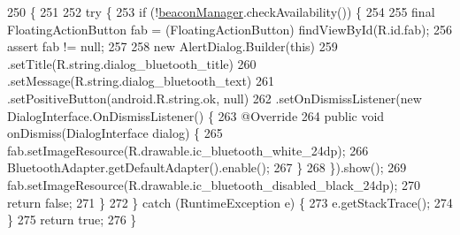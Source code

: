 \begin{DoxyCode}
250                                            \{
251 
252         \textcolor{keywordflow}{try} \{
253             \textcolor{keywordflow}{if} (!\hyperlink{classit_1_1unibo_1_1torsello_1_1bluetoothpositioning_1_1activities_1_1ApplicationActivity_a973c37226a3dbba6016966c3555aff65_a973c37226a3dbba6016966c3555aff65}{beaconManager}.checkAvailability()) \{
254 
255                 \textcolor{keyword}{final} FloatingActionButton fab = (FloatingActionButton) findViewById(R.id.fab);
256                 assert fab != null;
257 
258                 \textcolor{keyword}{new} AlertDialog.Builder(\textcolor{keyword}{this})
259                         .setTitle(R.string.dialog\_bluetooth\_title)
260                         .setMessage(R.string.dialog\_bluetooth\_text)
261                         .setPositiveButton(android.R.string.ok, null)
262                         .setOnDismissListener(\textcolor{keyword}{new} DialogInterface.OnDismissListener() \{
263                             @Override
264                             \textcolor{keyword}{public} \textcolor{keywordtype}{void} onDismiss(DialogInterface dialog) \{
265                                 fab.setImageResource(R.drawable.ic\_bluetooth\_white\_24dp);
266                                 BluetoothAdapter.getDefaultAdapter().enable();
267                             \}
268                         \}).show();
269                 fab.setImageResource(R.drawable.ic\_bluetooth\_disabled\_black\_24dp);
270                 \textcolor{keywordflow}{return} \textcolor{keyword}{false};
271             \}
272         \} \textcolor{keywordflow}{catch} (RuntimeException e) \{
273             e.getStackTrace();
274         \}
275         \textcolor{keywordflow}{return} \textcolor{keyword}{true};
276     \}
\end{DoxyCode}
\hypertarget{classit_1_1unibo_1_1torsello_1_1bluetoothpositioning_1_1activities_1_1ApplicationActivity_a0cdfc0658ba462b43e9e6b94bab90da1_a0cdfc0658ba462b43e9e6b94bab90da1}{}\label{classit_1_1unibo_1_1torsello_1_1bluetoothpositioning_1_1activities_1_1ApplicationActivity_a0cdfc0658ba462b43e9e6b94bab90da1_a0cdfc0658ba462b43e9e6b94bab90da1} 
